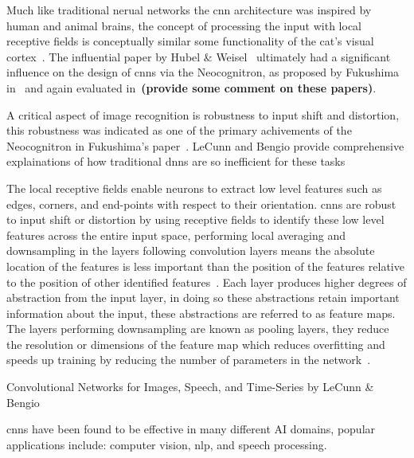 \documentclass[../../D1.tex]{subfiles}
\begin{document}
Much like traditional nerual networks the \Acrshort{cnn} architecture was inspired by human and animal brains, the concept of processing the input with local receptive fields is conceptually similar some functionality of the cat's visual cortex~\autocite{hubelReceptiveFieldsBinocular1962,lecunConvolutionalNetworksImages,pouyanfarSurveyDeepLearning2019}. 
The influential paper by Hubel \& Weisel~\autocite{hubelReceptiveFieldsBinocular1962} ultimately had a significant influence on the design of \Acrshort{cnn}s via the Neocognitron, as proposed by Fukushima in~\autocite{fukushimaNeocognitronSelforganizingNeural1980} and again evaluated in~\autocite{fukushimaNeocognitronHierarchicalNeural1988}\textbf{(provide some comment on these papers)}. 

A critical aspect of image recognition is robustness to input shift and distortion, this robustness was indicated as one of the primary achivements of the Neocognitron in Fukushima's paper~\autocite{fukushimaNeocognitronSelforganizingNeural1980}. LeCunn and Bengio provide comprehensive explainations of how traditional \acrshort{dnn}s are so inefficient for these tasks 


The local receptive fields enable neurons to extract low level features such as edges, corners, and end-points with respect to their orientation. 
\Acrshort{cnn}s are robust to input shift or distortion by using receptive fields to identify these low level features across the entire input space, performing local averaging and downsampling in the layers following convolution layers means the absolute location of the features is less important than the position of the features relative to the position of other identified features~\autocite{lecunConvolutionalNetworksImages}. 
Each layer produces higher degrees of abstraction from the input layer, in doing so these abstractions retain important information about the input, these abstractions are referred to as feature maps.
The layers performing downsampling are known as pooling layers, they reduce the resolution or dimensions of the feature map which reduces overfitting and speeds up training by reducing the number of parameters in the network~\autocite{pouyanfarSurveyDeepLearning2019}.

Convolutional Networks for Images, Speech, and Time-Series by LeCunn \& Bengio


\acrshort{cnn}s have been found to be effective in many different AI domains, popular applications include: computer vision, \Acrshort{nlp}, and speech processing. 
\end{document}
